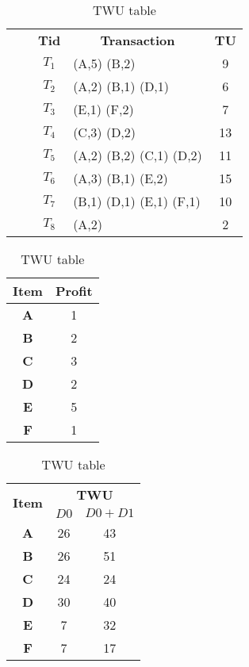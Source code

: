 \documentclass[runningheads,a4paper]{llncs}
\begin{document}
\begin{table}
\begin{minipage}[t]{.45\linewidth}
\centering
\caption{transaction database }
\begin{tabular}{ cc|c|l|c |} 
\cline{3-5} & & \textbf{Tid} & \multicolumn{1}{c|}{\textbf{Transaction}} & \textbf{TU} \\ 
\cline{3-5} 
\cline{3-5} {\multirow{5}{*}{\rotatebox{90}{ $ D0 $}}}& {\multirow{5}{*}{ }} & $ T_{1} $ & (A,5) (B,2) & 9\\ 
\cline{3-5}& & $ T_{2} $ & (A,2) (B,1) (D,1) & 6 \\
\cline{3-5}& & $ T_{3} $ & (E,1) (F,2) & 7 \\
\cline{3-5}& & $ T_{4} $ & (C,3) (D,2) & 13 \\
\cline{3-5}& & $ T_{5} $ & (A,2) (B,2) (C,1) (D,2) & 11 \\
\cline{2-5} {\multirow{3}{*}{\rotatebox{90}{ $ D1 $ }}}& & $ T_{6} $ & (A,3) (B,1) (E,2) & 15\\
\cline{3-5} & & $ T_{7} $ & (B,1) (D,1) (E,1) (F,1) & 10 \\
\cline{3-5} & & $ T_{8} $ & (A,2)  & 2 \\ 
\cline{3-5}
\end{tabular}
\label{table:1}
\end{minipage}
\begin{minipage}[t]{.25\linewidth}
\centering
\caption{Profit table}
\begin{tabular}{|c|c|} \hline
\textbf{Item} & \textbf{Profit} \\ \hline
\textbf{A} & 1 \\ \hline
\textbf{B} & 2 \\ \hline
\textbf{C} & 3\\ \hline
\textbf{D} & 2\\ \hline
\textbf{E} & 5\\ \hline
\textbf{F} & 1\\ \hline
\end{tabular}
\label{table:2}
\end{minipage}
\begin{minipage}[t]{.25\linewidth}
\centering
\caption{TWU table}
\begin{tabular}{|c|c|c|} \hline


\multicolumn{1}{|c}{\multirow{2}[0]{*}{\textbf{Item}}} & \multicolumn{2}{|c|}{\textbf{TWU}} \\
\cline{2-3}\multicolumn{1}{|c|}{} & $ D0 $    & $ D0+D1 $ \\
\cline{1-3}
\textbf{A} & 26& 43\\ \hline
\textbf{B} & 26& 51 \\ \hline
\textbf{C} & 24& 24\\ \hline
\textbf{D} & 30& 40 \\ \hline
\textbf{E} & 7& 32\\ \hline
\textbf{F} & 7& 17\\ \hline
\end{tabular}
\label{table:3}
\end{minipage}

\end{table}
\end{document}
